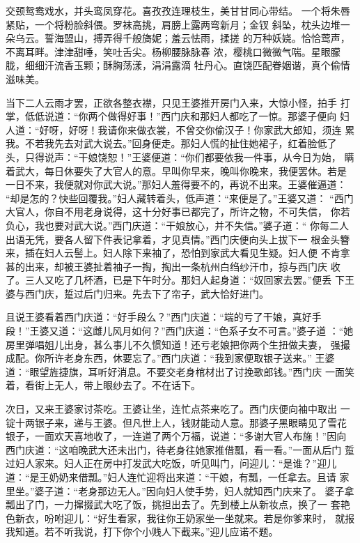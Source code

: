 交颈鸳鸯戏水，并头鸾凤穿花。喜孜孜连理枝生，美甘甘同心带结。
一个将朱唇紧贴，一个将粉脸斜偎。罗袜高挑，肩膀上露两弯新月；金钗
斜坠，枕头边堆一朵乌云。誓海盟山，搏弄得千般旖妮；羞云怯雨，揉搓
的万种妖娆。恰恰莺声，不离耳畔。津津甜唾，笑吐舌尖。杨柳腰脉脉春
浓，樱桃口微微气喘。星眼朦胧，细细汗流香玉颗；酥胸荡漾，涓涓露滴
牡丹心。直饶匹配眷姻谐，真个偷情滋味美。

当下二人云雨才罢，正欲各整衣襟，只见王婆推开房门入来，大惊小怪，拍手
打掌，低低说道：“你两个做得好事！”西门庆和那妇人都吃了一惊。那婆子便向
妇人道：“好呀，好呀！我请你来做衣裳，不曾交你偷汉子！你家武大郎知，须连
累我。不若我先去对武大说去。”回身便走。那妇人慌的扯住她裙子，红着脸低了
头，只得说声：“干娘饶恕！”王婆便道：“你们都要依我一件事，从今日为始，
瞒着武大，每日休要失了大官人的意。早叫你早来，晚叫你晚来，我便罢休。若是
一日不来，我便就对你武大说。”那妇人羞得要不的，再说不出来。王婆催逼道：
“却是怎的？快些回覆我。”妇人藏转着头，低声道：“来便是了。”王婆又道：
“西门大官人，你自不用老身说得，这十分好事已都完了，所许之物，不可失信，
你若负心，我也要对武大说。”西门庆道：“干娘放心，并不失信。”婆子道：“
你每二人出语无凭，要各人留下件表记拿着，才见真情。”西门庆便向头上拔下一
根金头簪来，插在妇人云髻上。妇人除下来袖了，恐怕到家武大看见生疑。妇人便
不肯拿甚的出来，却被王婆扯着袖子一掏，掏出一条杭州白绉纱汗巾，掠与西门庆
收了。三人又吃了几杯酒，已是下午时分。那妇人起身道：“奴回家去罢。”便丢
下王婆与西门庆，踅过后门归来。先去下了帘子，武大恰好进门。

且说王婆看着西门庆道：“好手段么？”西门庆道：“端的亏了干娘，真好手
段！”王婆又道：“这雌儿风月如何？”西门庆道：“色系子女不可言。”婆子道
：“她房里弹唱姐儿出身，甚么事儿不久惯知道！还亏老娘把你两个生扭做夫妻，
强撮成配。你所许老身东西，休要忘了。”西门庆道：“我到家便取银子送来。”
王婆道：“眼望旌捷旗，耳听好消息。不要交老身棺材出了讨挽歌郎钱。”西门庆
一面笑着，看街上无人，带上眼纱去了。不在话下。

次日，又来王婆家讨茶吃。王婆让坐，连忙点茶来吃了。西门庆便向袖中取出
一锭十两银子来，递与王婆。但凡世上人，钱财能动人意。那婆子黑眼睛见了雪花
银子，一面欢天喜地收了，一连道了两个万福，说道：“多谢大官人布施！”因向
西门庆道：“这咱晚武大还未出门，待老身往她家推借瓢，看一看。”一面从后门
踅过妇人家来。妇人正在房中打发武大吃饭，听见叫门，问迎儿：“是谁？”迎儿
道：“是王奶奶来借瓢。”妇人连忙迎将出来道：“干娘，有瓢，一任拿去。且请
家里坐。”婆子道：“老身那边无人。”因向妇人使手势，妇人就知西门庆来了。
婆子拿瓢出了门，一力撺掇武大吃了饭，挑担出去了。先到楼上从新妆点，换了一
套艳色新衣，吩咐迎儿：“好生看家，我往你王奶家坐一坐就来。若是你爹来时，
就报我知道。若不听我说，打下你个小贱人下截来。”迎儿应诺不题。

